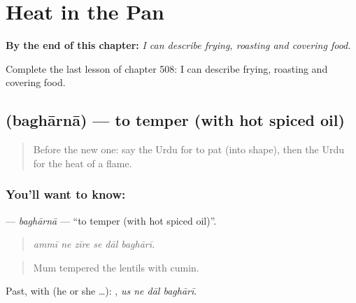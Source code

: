 
\chapter{Heat in the Pan}
\label{ch:ur-heat-in-the-pan}

\begin{chapteropening}
\textbf{By the end of this chapter:} \emph{I can describe frying, roasting and covering food.}

Complete the last lesson of chapter 508: I can describe frying, roasting and covering food.
\end{chapteropening}

\section[\texorpdfstring{\ur{بگھارنا} (baghārnā)}{بگھارنا (baghārnā)}]{ (baghārnā) — to temper (with hot spiced oil)}

\label{lesson:UR-C508-bagharna}



\begin{quote}
Before the new one: say the Urdu for to pat (into shape), then the Urdu for the heat of a flame.
\end{quote}

\subsection*{You'll want to know: }
\textbf{} — \emph{baghārnā} — \textquotedblleft{}to temper (with hot spiced oil)\textquotedblright{}.

\begin{quote}
     
\end{quote}

\begin{quote}
\emph{ammī ne zīre se dāl baghārī.}
\end{quote}

\begin{quote}
Mum tempered the lentils with cumin.
\end{quote}

Past, with  (he or she …):    , \emph{us ne dāl baghārī}.

